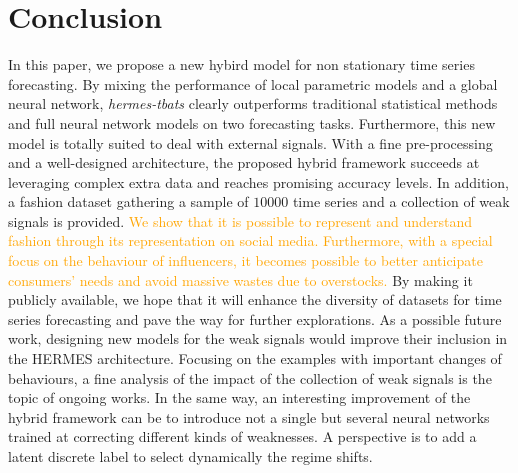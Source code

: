 \documentclass[10pt]{article} %
\newcommand{\numberts}{10000}
\begin{document}
\section{Conclusion}
\label{sec:conclusion}
In this paper, we propose  a new hybird model for non stationary time series forecasting. By mixing the performance of local parametric models and a global neural network, \textit{hermes-tbats} clearly outperforms traditional statistical methods and full neural network models on two forecasting tasks. Furthermore, this new model is totally suited to deal with external signals. With a fine pre-processing and a well-designed architecture, the proposed hybrid framework succeeds at leveraging complex extra data and reaches promising accuracy levels. In addition, a fashion dataset gathering a sample of $\numberts$ time series and a collection of weak signals is provided. \textcolor{orange}{We show that it is possible to represent and understand fashion through its representation on social media. Furthermore, with a special focus on the behaviour of influencers, it becomes possible to better anticipate consumers' needs and avoid massive wastes due to overstocks.} By making it publicly available, we hope that it will enhance the diversity of datasets for time series forecasting and pave the way for further explorations.
As a possible future work, designing new models for the weak signals would improve their inclusion  in the HERMES architecture. Focusing on the examples with important changes of behaviours, a fine analysis of the impact of the collection of weak signals is the topic of ongoing works. In the same way, an interesting improvement of the hybrid framework can be to introduce not a single but several neural networks trained at correcting different kinds of weaknesses. A perspective is to add a latent discrete label to select dynamically the regime shifts. 




\appendix
\end{document}
